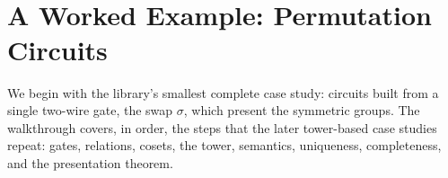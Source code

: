 \begin{code}[hide]
\AgdaSymbol{;}\AgdaSpace{}%
\AgdaSpace{}%
\AgdaSymbol{;}\AgdaSpace{}%
\AgdaSpace{}%
\AgdaSymbol{;}\AgdaSpace{}%
\AgdaSymbol{)}\<%
\\
\>[0]\AgdaSpace{}%
\AgdaSpace{}%
\AgdaSpace{}%
\AgdaSpace{}%
\AgdaSymbol{(}\AgdaSymbol{)}\<%
\\
\>[0]\AgdaSpace{}%
\AgdaSpace{}%
\AgdaSpace{}%
\AgdaSpace{}%
\AgdaSymbol{(}\AgdaSymbol{)}\<%
\\
\>[0]\AgdaSpace{}%
\AgdaSpace{}%
\AgdaSpace{}%
\<%
\\
%
\\[\AgdaEmptyExtraSkip]%
\>[0]\<%
\\
\>[0][@{}l@{\AgdaIndent{0}}]%
\>[2]\AgdaSpace{}%
\AgdaSymbol{:}\AgdaSpace{}%
\AgdaSpace{}%
\AgdaSymbol{\{}\AgdaSymbol{\}}\AgdaSpace{}%
\AgdaSymbol{\{}\AgdaSpace{}%
\AgdaSymbol{:}\AgdaSpace{}%
\AgdaSpace{}%
\AgdaSymbol{\}}\AgdaSpace{}%
\AgdaSpace{}%
\<%
\\
%
\\[\AgdaEmptyExtraSkip]%
\>[0]\AgdaSpace{}%
\<%
\\
\>[0][@{}l@{\AgdaIndent{0}}]%
\>[2]\AgdaSpace{}%
\AgdaSymbol{:}\AgdaSpace{}%
\<%
\end{code}
\section{A Worked Example: Permutation Circuits}\label{sec:permutations}

We begin with the library's smallest complete case study: circuits built
from a single two-wire gate, the swap $\sigma$, which present the symmetric
groups.  The walkthrough covers, in order, the steps that the later
tower-based case studies repeat: gates, relations, cosets, the tower,
semantics, uniqueness, completeness, and the presentation theorem.

